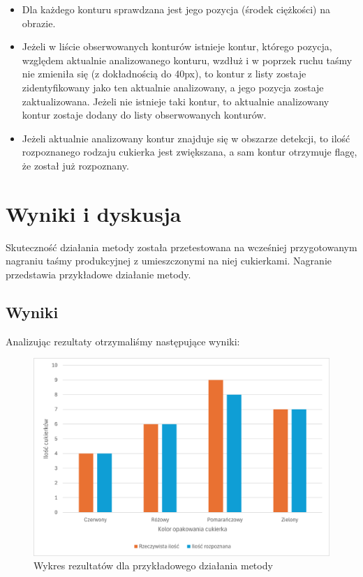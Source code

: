\documentclass{article}
\begin{document}
\begin{enumerate}
    \begin{itemize}
        \item Dla każdego konturu sprawdzana jest jego pozycja (środek ciężkości) na obrazie.
        \item Jeżeli w liście obserwowanych konturów istnieje kontur, którego pozycja, względem aktualnie analizowanego konturu, wzdłuż i w poprzek ruchu taśmy nie zmieniła się (z dokładnością do 40px), to kontur z listy zostaje zidentyfikowany jako ten aktualnie analizowany, a jego pozycja zostaje zaktualizowana. Jeżeli nie istnieje taki kontur, to aktualnie analizowany kontur zostaje dodany do listy obserwowanych konturów.
        \item Jeżeli aktualnie analizowany kontur znajduje się w obszarze detekcji, to ilość rozpoznanego rodzaju cukierka jest zwiększana, a sam kontur otrzymuje flagę, że został już rozpoznany.
    \end{itemize}
\end{enumerate}

\section{Wyniki i dyskusja}
\label{Wyniki i dyskusja}
Skuteczność działania metody została przetestowana na wcześniej przygotowanym nagraniu taśmy produkcyjnej z umieszczonymi na niej cukierkami. Nagranie przedstawia przykładowe działanie metody.
\subsection{Wyniki}
Analizując rezultaty otrzymaliśmy następujące wyniki:

\begin{figure}[H]
    \centering
    \includegraphics[width=\linewidth]{wykresSkutecznosci}
    \caption{Wykres rezultatów dla przykładowego działania metody}
    \label{fig:wykresSkutecznosci}
\end{figure}
\end{document}
